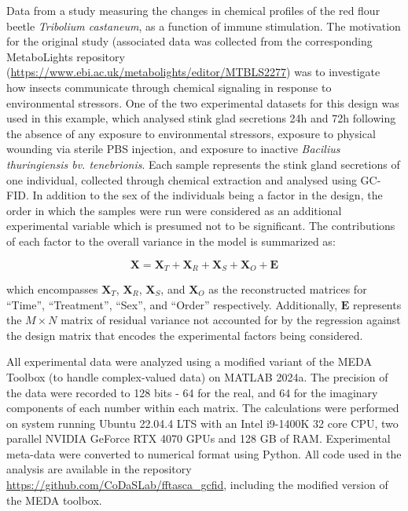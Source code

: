 \documentclass[preprint,12pt]{elsarticle}
\begin{document}
Data from a study measuring the changes in chemical profiles of the red flour beetle \textit{Tribolium castaneum}, as a function of immune stimulation. The motivation for the original study \cite{lo2023immune} (associated data was collected from the corresponding MetaboLights repository (\url{https://www.ebi.ac.uk/metabolights/editor/MTBLS2277}) was to investigate how insects communicate through chemical signaling in response to environmental stressors. One of the two experimental datasets for this design was used in this example, which analysed stink glad secretions 24h and 72h following the absence of any exposure to environmental stressors, exposure to physical wounding via sterile PBS injection, and exposure to inactive \textit{Bacilius thuringiensis bv. tenebrionis}. Each sample represents the stink gland secretions of one individual, collected through chemical extraction and analysed using GC-FID. In addition to the sex of the individuals being a factor in the design, the order in which the samples were run were considered as an additional experimental variable which is presumed not to be significant. The contributions of each factor to the overall variance in the model is summarized as:

\begin{equation}\label{eq:GLM}
    \mathbf{X} = \mathbf{X}_T + \mathbf{X}_R + \mathbf{X}_S + \mathbf{X}_O + \mathbf{E}
\end{equation}

\noindent which encompasses $\mathbf{X}_T$, $\mathbf{X}_R$, $\mathbf{X}_S$, and $\mathbf{X}_O$ as the reconstructed matrices for ``Time'', ``Treatment'', ``Sex'', and ``Order'' respectively. Additionally, $\mathbf{E}$ represents the $M \times N$ matrix of residual variance not accounted for by the regression against the design matrix that encodes the experimental factors being considered. 

All experimental data were analyzed using a modified variant of the MEDA Toolbox \cite{camacho2015multivariate} (to handle complex-valued data) on MATLAB 2024a. The precision of the data were recorded to 128 bits - 64 for the real, and 64 for the imaginary components of each number within each matrix. The calculations were performed on system running Ubuntu 22.04.4 LTS with an Intel i9-1400K 32 core CPU, two parallel NVIDIA GeForce RTX 4070 GPUs and 128 GB of RAM. Experimental meta-data were converted to numerical format using Python. All code used in the analysis are available in the repository \url{https://github.com/CoDaSLab/fftasca_gcfid}, including the modified version of the MEDA toolbox.
\end{document}
